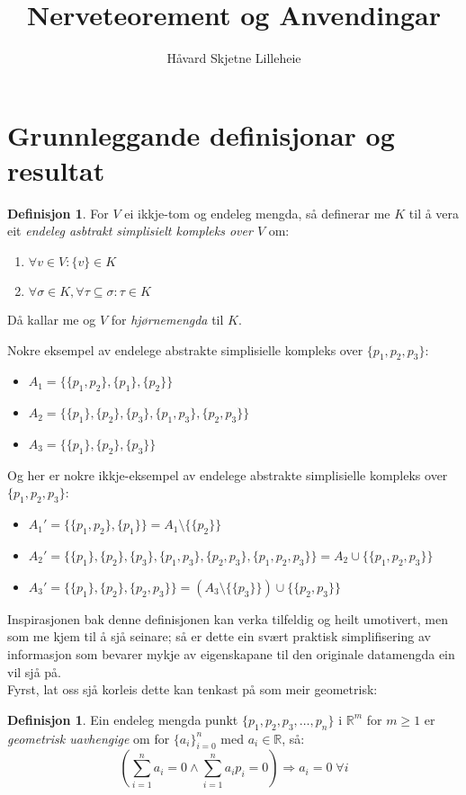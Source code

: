 \documentclass[a4paper, titlepage, 12pt, norsk]{article}
\title{Nerveteorement og Anvendingar}
\author{Håvard Skjetne Lilleheie}
\theoremstyle{plain}
\theoremstyle{definition}
\newtheorem{definition}[theorem]{Definisjon}
\newcommand{\R}{\mathbb{R}}
\begin{document}
\maketitle

\section{Grunnleggande definisjonar og resultat}

\begin{definition}
	For $V$ ei ikkje-tom og endeleg mengda, så definerar me $K$ til å vera eit \emph{endeleg asbtrakt simplisielt kompleks over $V$} om:
	\begin{enumerate}
		\item{$\forall v \in V: \{v\} \in K$}
		\item{$\forall \sigma \in K, \forall \tau \subseteq \sigma: \tau \in K$}
	\end{enumerate}
	Då kallar me og $V$ for \emph{hjørnemengda} til $K$.
\end{definition}
\noindent Nokre eksempel av endelege abstrakte simplisielle kompleks over $\{p_1, p_2, p_3\}$:
\begin{itemize}
	\item{$A_1=\{\{p_1, p_2\}, \{p_1\}, \{p_2\}\}$}
	\item{$A_2=\{\{p_1\}, \{p_2\}, \{p_3\}, \{p_1, p_3\}, \{p_2, p_3\}\}$}
	\item{$A_3=\{\{p_1\}, \{p_2\}, \{p_3\}\}$}
\end{itemize}
Og her er nokre ikkje-eksempel av endelege abstrakte simplisielle kompleks over $\{p_1, p_2, p_3\}$:
\begin{itemize}
	\item{$A_1'=\{\{p_1, p_2\}, \{p_1\}\}=A_1 \setminus \{\{p_2\}\}$}
	\item{$A_2'=\{\{p_1\}, \{p_2\}, \{p_3\}, \{p_1, p_3\}, \{p_2, p_3\}, \{p_1, p_2, p_3\}\}=A_2 \cup \{\{p_1, p_2, p_3\}\}$}
	\item{$A_3'=\{\{p_1\}, \{p_2\}, \{p_2, p_3\}\}=\left(A_3 \setminus \{\{p_3\}\}\right) \cup \{\{p_2, p_3\}\}$}
\end{itemize}
Inspirasjonen bak denne definisjonen kan verka tilfeldig og heilt umotivert, men som me kjem til å sjå seinare; så er dette ein svært praktisk simplifisering av informasjon som bevarer mykje av eigenskapane til den originale datamengda ein vil sjå på. 
\\Fyrst, lat oss sjå korleis dette kan tenkast på som meir geometrisk:
\begin{definition}
	Ein endeleg mengda punkt $\{p_1, p_2, p_3, \dots, p_n\}$ i $\R^m$ for $m\geq1$ er \emph{geometrisk uavhengige} om for $\{a_i\}_{i=0}^n$ med $a_i\in\R$, så:
	\begin{equation*}
		\left(\sum_{i=1}^n a_i=0 \land  \sum_{i=1}^n a_ip_i=0\right)\Rightarrow a_i=0 \; \forall i
	\end{equation*}
\end{definition}
\end{document}
